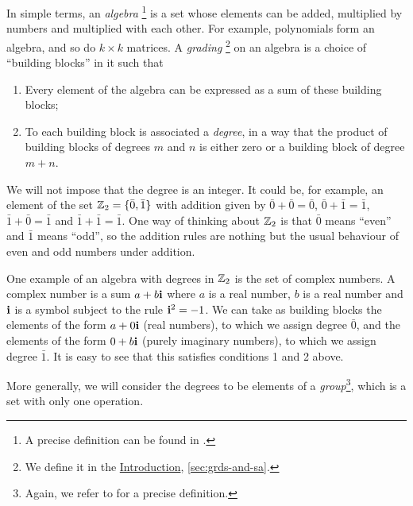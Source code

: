 \begin{prefatory}
In simple terms, an \emph{algebra}
\footnote{A precise definition can be found in \cite[Chapter 1]{MR3932087}.}
is a set whose elements can be added, multiplied by numbers and multiplied with each other. 
For example, polynomials form an algebra, and so do $k \times k$ matrices. 
A \emph{grading}
\footnote{
    We define it in the \hyperref[chap:intro]{Introduction}, \cref{sec:grds-and-sa}.
} 
on an algebra is a choice of ``building blocks'' in it such that
\begin{enumerate}
    \item Every element of the algebra can be expressed as a sum of these building blocks;
    \item To each building block is associated a \emph{degree}, in a way that the product of building blocks of degrees $m$ and $n$ is either zero or a building block of degree $m+n$.
\end{enumerate}
We will not impose that the degree is an integer. 
It could be, for example, an element of the set $\mathbb{Z}_2 = \{ \bar 0, \bar 1 \}$ with addition given by 
$\bar 0 + \bar 0 = \bar 0$, 
$\bar 0 + \bar 1 = \bar 1$, 
$\bar 1 + \bar 0 = \bar 1$ and 
$\bar 1 + \bar 1 = \bar 1$. 
One way of thinking about $\mathbb{Z}_2$ is that $\bar 0$ means ``even'' and $\bar 1$ means ``odd'', so the addition rules are nothing but the usual behaviour of even and odd numbers under addition. 

One example of an algebra with degrees in $\mathbb{Z}_2$ is the set of complex numbers. 
A complex number is a sum $a + b\mathbf{i}$ where $a$ is a real number, $b$ is a real number and $\mathbf{i}$ is a symbol subject to the rule $\mathbf{i}^2 = -1$. 
We can take as building blocks the elements of the form $a + 0\mathbf{i}$ (real numbers), to which we assign degree $\bar 0$, and the elements of the form $0 + b\mathbf{i}$ (purely imaginary numbers), to which we assign degree $\bar 1$. 
It is easy to see that this satisfies conditions 1 and 2 above. 

More generally, we will consider the degrees to be elements of a \emph{group}\footnote{Again, we refer to \cite[Chapter 1]{MR3932087} for a precise definition.}, which is a set with only one operation. 


\end{prefatory}
